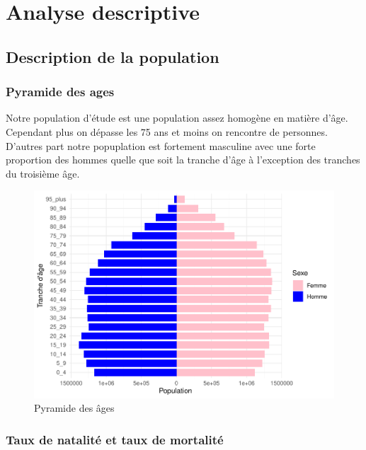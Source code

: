 \documentclass[
]{article}
\begin{document}
\section{Analyse descriptive}\label{analyse-descriptive}

\subsection{Description de la
population}\label{description-de-la-population}

\subsubsection{Pyramide des ages}\label{pyramide-des-ages}

Notre population d'étude est une population assez homogène en matière
d'âge. Cependant plus on dépasse les 75 ans et moins on rencontre de
personnes. D'autres part notre popuplation est fortement masculine avec
une forte proportion des hommes quelle que soit la tranche d'âge à
l'exception des tranches du troisième âge.

\begin{figure}

{\centering \includegraphics{4_Analyse_Descriptive_files/figure-latex/unnamed-chunk-3-1} 

}

\caption{Pyramide des âges}\label{fig:unnamed-chunk-3}
\end{figure}

\subsubsection{Taux de natalité et taux de
mortalité}\label{taux-de-natalituxe9-et-taux-de-mortalituxe9}
\end{document}
